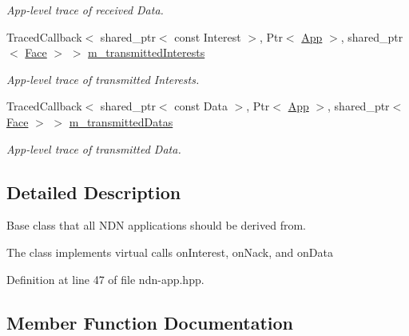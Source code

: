 \begin{DoxyCompactItemize}
\begin{DoxyCompactList}\small\item\em App-\/level trace of received Data. \end{DoxyCompactList}\item 
Traced\+Callback$<$ shared\+\_\+ptr$<$ const Interest $>$, Ptr$<$ \hyperlink{classns3_1_1ndn_1_1App}{App} $>$, shared\+\_\+ptr$<$ \hyperlink{classnfd_1_1Face}{Face} $>$ $>$ \hyperlink{classns3_1_1ndn_1_1App_a1a5407730c55c227cfab534513b2d156}{m\+\_\+transmitted\+Interests}\hypertarget{classns3_1_1ndn_1_1App_a1a5407730c55c227cfab534513b2d156}{}\label{classns3_1_1ndn_1_1App_a1a5407730c55c227cfab534513b2d156}

\begin{DoxyCompactList}\small\item\em App-\/level trace of transmitted Interests. \end{DoxyCompactList}\item 
Traced\+Callback$<$ shared\+\_\+ptr$<$ const Data $>$, Ptr$<$ \hyperlink{classns3_1_1ndn_1_1App}{App} $>$, shared\+\_\+ptr$<$ \hyperlink{classnfd_1_1Face}{Face} $>$ $>$ \hyperlink{classns3_1_1ndn_1_1App_a561f51cc1a75ea61581d2c14766fda96}{m\+\_\+transmitted\+Datas}\hypertarget{classns3_1_1ndn_1_1App_a561f51cc1a75ea61581d2c14766fda96}{}\label{classns3_1_1ndn_1_1App_a561f51cc1a75ea61581d2c14766fda96}

\begin{DoxyCompactList}\small\item\em App-\/level trace of transmitted Data. \end{DoxyCompactList}\end{DoxyCompactItemize}


\subsection{Detailed Description}
Base class that all N\+DN applications should be derived from. 

The class implements virtual calls on\+Interest, on\+Nack, and on\+Data 

Definition at line 47 of file ndn-\/app.\+hpp.



\subsection{Member Function Documentation}
